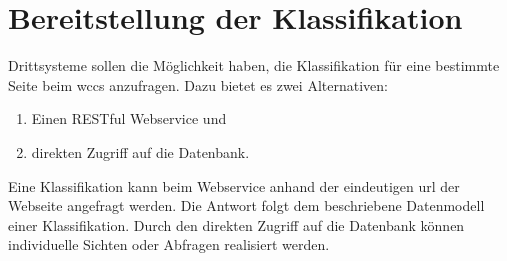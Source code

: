 \section{Bereitstellung der Klassifikation}
    Drittsysteme sollen die Möglichkeit haben,
    die Klassifikation für eine bestimmte Seite beim \gls{wccs} anzufragen.
    Dazu bietet es zwei Alternativen:

    \begin{enumerate}
        \item Einen RESTful Webservice und
        \item direkten Zugriff auf die Datenbank.
    \end{enumerate}

    Eine Klassifikation kann beim Webservice anhand der eindeutigen \gls{url} der Webseite angefragt werden.
    Die Antwort folgt dem beschriebene Datenmodell einer
    Klassifikation.
    Durch den direkten Zugriff auf die Datenbank können
    individuelle Sichten oder Abfragen realisiert werden.
